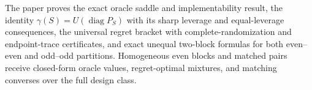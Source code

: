 The paper proves the exact oracle saddle and implementability result, the identity \(\gamma(S)=U(\operatorname{diag}P_S)\) with its sharp leverage and equal-leverage consequences, the universal regret bracket with complete-randomization and endpoint-trace certificates, and exact unequal two-block formulas for both even--even and odd--odd partitions.  Homogeneous even blocks and matched pairs receive closed-form oracle values, regret-optimal mixtures, and matching converses over the full design class.
